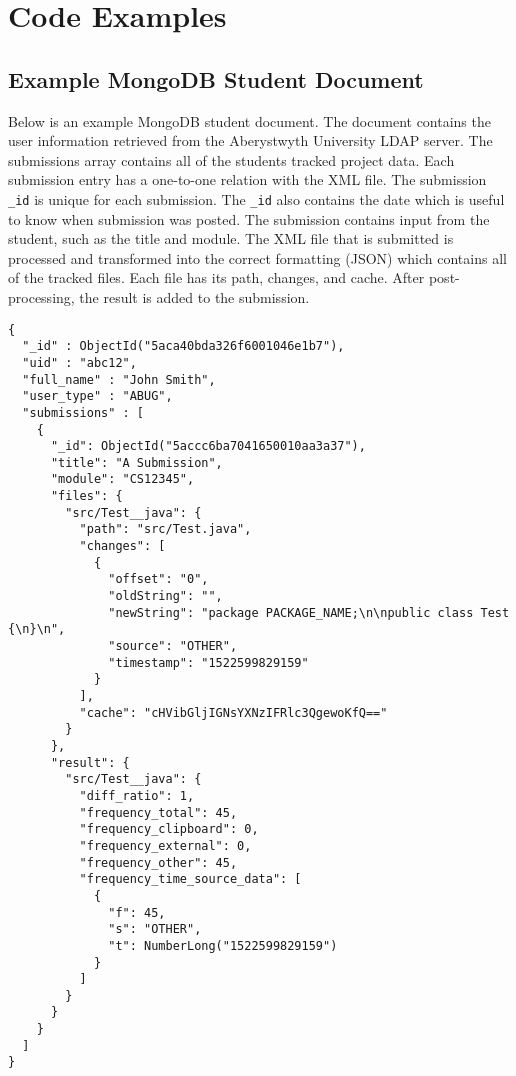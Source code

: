 \chapter{Code Examples}
\label{chp:code-examples}
\section{Example MongoDB Student Document}
\label{fig:mongodb-student-document}

Below is an example MongoDB student document. The document contains the user information retrieved from the Aberystwyth University LDAP server. The submissions array contains all of the students tracked project data. Each submission entry has a one-to-one relation with the XML file. The submission \texttt{\_id} is unique for each submission. The \texttt{\_id} also contains the date which is useful to know when submission was posted. The submission contains input from the student, such as the title and module. The XML file that is submitted is processed and transformed into the correct formatting (JSON) which contains all of the tracked files. Each file has its path, changes, and cache. After post-processing, the result is added to the submission. 

\begin{lstlisting}
{
  "_id" : ObjectId("5aca40bda326f6001046e1b7"),
  "uid" : "abc12",
  "full_name" : "John Smith",
  "user_type" : "ABUG",
  "submissions" : [
    {
      "_id": ObjectId("5accc6ba7041650010aa3a37"),
      "title": "A Submission",
      "module": "CS12345",
      "files": {
        "src/Test__java": {
          "path": "src/Test.java",
          "changes": [
            {
              "offset": "0",
              "oldString": "",
              "newString": "package PACKAGE_NAME;\n\npublic class Test {\n}\n",
              "source": "OTHER",
              "timestamp": "1522599829159"
            }
          ],
          "cache": "cHVibGljIGNsYXNzIFRlc3QgewoKfQ=="
        }
      },
      "result": {
        "src/Test__java": {
          "diff_ratio": 1,
          "frequency_total": 45,
          "frequency_clipboard": 0,
          "frequency_external": 0,
          "frequency_other": 45,
          "frequency_time_source_data": [
            {
              "f": 45,
              "s": "OTHER",
              "t": NumberLong("1522599829159")
            }
          ]
        }
      }
    }
  ]
}
\end{lstlisting}
